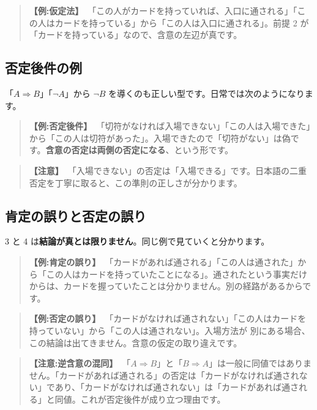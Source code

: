 \documentclass{article}
\begin{document}
\begin{quote}
\textbf{【例:仮定法】}\ 「この人がカードを持っていれば、入口に通される」「この人はカードを持っている」から「この人は入口に通される」。前提 2 が「カードを持っている」なので、含意の左辺が真です。
\end{quote}

\subsection{否定後件の例}

「\(A \Rightarrow B\)」「\(\neg A\)」から \(\neg B\) を導くのも正しい型です。日常では次のようになります。

\begin{quote}
\textbf{【例:否定後件】}\ 「切符がなければ入場できない」「この人は入場できた」から「この人は切符があった」。入場できたので「切符がない」は偽です。\textbf{含意の否定は両側の否定になる}、という形です。
\end{quote}

\begin{quote}
\textbf{【注意】}\ 「入場できない」の否定は「入場できる」です。日本語の二重否定を丁寧に取ると、この準則の正しさが分かります。
\end{quote}

\subsection{肯定の誤りと否定の誤り}

3 と 4 は\textbf{結論が真とは限りません}。同じ例で見ていくと分かります。

\begin{quote}
\textbf{【例:肯定の誤り】}\ 「カードがあれば通される」「この人は通された」から「この人はカードを持っていたことになる」。通されたという事実だけからは、カードを握っていたことは分かりません。別の経路があるからです。
\end{quote}

\begin{quote}
\textbf{【例:否定の誤り】}\ 「カードがなければ通されない」「この人はカードを持っていない」から「この人は通されない」。入場方法が 別にある場合、この結論は出てきません。含意の仮定の取り違えです。
\end{quote}

\begin{quote}
\textbf{【注意:逆含意の混同】}\ 「\(A \Rightarrow B\)」と「\(B \Rightarrow A\)」は一般に同値ではありません。「カードがあれば通される」の否定は「カードがなければ通されない」であり、「カードがなければ通されない」は「カードがあれば通される」と同値。これが否定後件が成り立つ理由です。
\end{quote}
\end{document}
